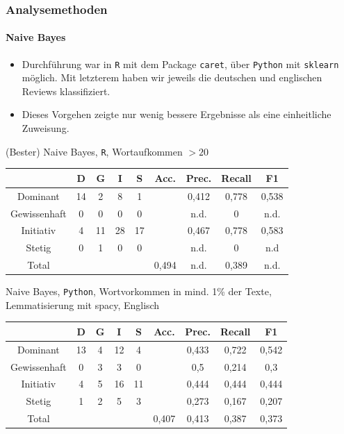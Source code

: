 \documentclass{beamer}
\begin{document}
\begin{frame}
\frametitle{Analysemethoden}
\framesubtitle{Naive Bayes}
\begin{itemize}\itemsep12pt
\item Durchführung war in \texttt{R} mit dem Package \texttt{caret}, über \texttt{Python} mit \texttt{sklearn} möglich. Mit letzterem haben wir jeweils die deutschen und englischen Reviews klassifiziert.
\item Dieses Vorgehen zeigte nur wenig bessere Ergebnisse als eine einheitliche Zuweisung.
\end{itemize}
\begin{center}
(Bester) Naive Bayes, \texttt{R}, Wortaufkommen $> 20$\
\begin{tabular}{|c|c|c|c|c|c|c|c|c|}
\hline
				& D 	& G	& I & S	& Acc.	& Prec. & Recall	& F1\\
\hline
Dominant 		& 14		& 2 			& 8 		& 1 		&       	& 0,412 	& 0,778 	& 0,538\\
Gewissenhaft 	& 0 		& 0 			& 0 		& 0 		& 			& n.d. 		& 0 	& n.d.\\
Initiativ 		& 4 		& 11			& 28		& 17		& 			& 0,467	& 0,778 	& 0,583\\
Stetig 			& 0 		& 1 			& 0 		& 0 		& 			& n.d.	   		& 0 	& n.d\\
\hline
Total 			& 			& 				& 			& 			& 0,494		& n.d. 		& 0,389  	& n.d.\\
\hline
\end{tabular}
\end{center}
\end{frame}

\begin{frame}
\begin{center}
Naive Bayes, \texttt{Python}, Wortvorkommen in mind. 1\% der Texte,\\
Lemmatisierung mit spacy, Englisch\
\begin{tabular}{|c|c|c|c|c|c|c|c|c|}
\hline
 & D 	& G	& I & S	& Acc.	& Prec. & Recall	& F1\\
\hline
Dominant & 13 & 4 & 12 & 4 & & 0,433 & 0,722 & 0,542\\
Gewissenhaft & 0 & 3 & 3 & 0 & & 0,5 & 0,214 & 0,3\\
Initiativ & 4 & 5 & 16 & 11 & & 0,444 & 0,444 & 0,444\\
Stetig & 1 & 2 & 5 & 3 & & 0,273 & 0,167 & 0,207\\
\hline
Total  &   &   &   &   & 0,407 & 0,413  & 0,387   & 0,373\\
\hline
\end{tabular}
\end{center}
\end{frame}
\end{document}
